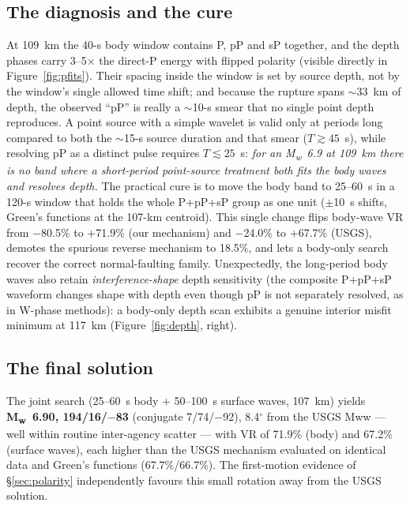 \documentclass[11pt]{article}
\newcommand{\Mw}{M\textsubscript{w}}
\begin{document}
\subsection{The diagnosis and the cure}
At 109~km the 40-s body window contains P, pP and sP together, and the depth phases carry
3--5$\times$ the direct-P energy with flipped polarity (visible directly in
Figure~\ref{fig:pfits}). Their spacing inside the window is set by source depth, not by the
window's single allowed time shift; and because the rupture spans $\sim$33~km of depth, the
observed ``pP'' is really a $\sim$10-s smear that no single point depth reproduces. A point
source with a simple wavelet is valid only at periods long compared to both the $\sim$15-s
source duration and that smear ($T\gtrsim45$~s), while resolving pP as a distinct pulse
requires $T\lesssim25$~s: \emph{for an \Mw~6.9 at 109~km there is no band where a short-period
point-source treatment both fits the body waves and resolves depth.} The practical cure is to
move the body band to 25--60~s in a 120-s window that holds the whole P+pP+sP group as one
unit ($\pm$10~s shifts, Green's functions at the 107-km centroid). This single change flips
body-wave VR from $-$80.5\% to $+$71.9\% (our mechanism) and $-$24.0\% to $+$67.7\% (USGS),
demotes the spurious reverse mechanism to 18.5\%, and lets a body-only search recover the
correct normal-faulting family. Unexpectedly, the long-period body waves also retain
\emph{interference-shape} depth sensitivity (the composite P+pP+sP waveform changes shape with
depth even though pP is not separately resolved, as in W-phase methods): a body-only depth
scan exhibits a genuine interior misfit minimum at 117~km (Figure~\ref{fig:depth}, right).

\subsection{The final solution}
The joint search (25--60~s body + 50--100~s surface waves, 107~km) yields \textbf{\Mw~6.90,
194/16/$-$83} (conjugate 7/74/$-$92), 8.4$^\circ$ from the USGS Mww --- well within routine
inter-agency scatter --- with VR of 71.9\% (body) and 67.2\% (surface waves), each higher than
the USGS mechanism evaluated on identical data and Green's functions (67.7\%/66.7\%). The
first-motion evidence of \S\ref{sec:polarity} independently favours this small rotation away
from the USGS solution.
\end{document}
